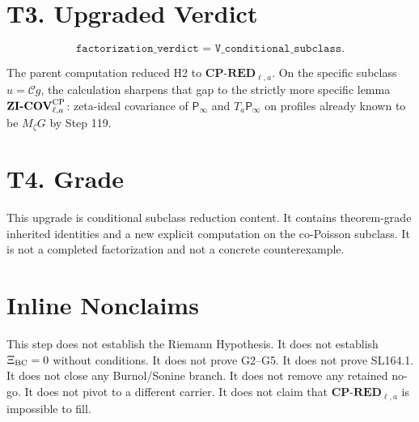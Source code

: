 \documentclass[11pt]{article}
\newcommand{\Pinfm}{\mathsf P_{\infty}}
\newcommand{\Chat}{\mathcal C}
\newcommand{\zetaF}{\zeta}
\begin{document}
\section{T3. Upgraded Verdict}

\[
\boxed{\texttt{factorization\_verdict = V\_conditional\_subclass}.}
\]

The parent computation reduced H2 to \(\textbf{CP-RED}_{\ell,a}\). On the
specific subclass \(u=\Chat g\), the calculation sharpens that gap to the
strictly more specific lemma \(\textbf{ZI-COV}^{\rm CP}_{\ell,a}\):
zeta-ideal covariance of \(\Pinfm\) and \(T_a\Pinfm\) on profiles already known
to be \(M_{\zetaF}G\) by Step 119.

\section{T4. Grade}

This upgrade is conditional subclass reduction content. It contains
theorem-grade inherited identities and a new explicit computation on the
co-Poisson subclass. It is not a completed factorization and not a concrete
counterexample.

\section{Inline Nonclaims}

This step does not establish the Riemann Hypothesis. It does not establish
\(\Xi_{\rm BC}=0\) without conditions. It does not prove G2--G5. It does not
prove SL164.1. It does not close any Burnol/Sonine branch. It does not remove
any retained no-go. It does not pivot to a different carrier. It does not claim
that \(\textbf{CP-RED}_{\ell,a}\) is impossible to fill.
\end{document}
